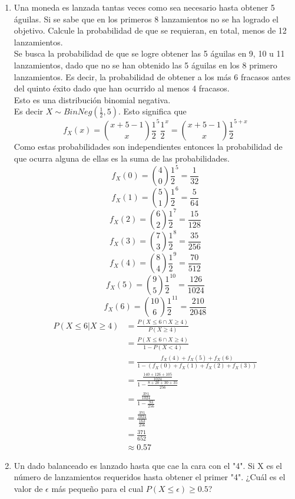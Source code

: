 \documentclass[11pt,a4paper]{report}
\begin{document}
\begin{enumerate}
		\item{
			Una moneda es lanzada tantas veces como sea necesario hasta obtener
            5 águilas. Si se sabe que en los primeros 8 lanzamientos no se ha
            logrado el objetivo. Calcule la probabilidad de que se requieran, en
            total, menos de 12 lanzamientos.\\
			Se busca la probabilidad de que se logre obtener las 5 águilas en 9,
			10 u 11 lanzamientos, dado que no se han obtenido las 5 águilas en
			los 8 primero lanzamientos. Es decir, la probabilidad de obtener a
			los más 6 fracasos antes del quinto éxito dado que han ocurrido
			al menos 4 fracasos. \\
			Esto es una distribución binomial negativa.\\
			Es decir $X \sim BinNeg(\frac{1}{2}, 5)$. Esto significa que
			\[f_X(x) = {x+5-1 \choose x} \frac{1}{2}^5 \frac{1}{2}^x =
			{x+5-1 \choose x} \frac{1}{2}^{5+x}\]
			Como estas probabilidades son independientes entonces la probabilidad
			de que ocurra alguna de ellas es la suma de las probabilidades.
			\[f_X(0) = {4 \choose 0} \frac{1}{2}^{5} = \frac{1}{32}\]
			\[f_X(1) = {5 \choose 1} \frac{1}{2}^{6} = \frac{5}{64}\]
			\[f_X(2) = {6 \choose 2} \frac{1}{2}^{7} = \frac{15}{128}\]
			\[f_X(3) = {7 \choose 3} \frac{1}{2}^{8} = \frac{35}{256}\]
			\[f_X(4) = {8 \choose 4} \frac{1}{2}^{9} = \frac{70}{512}\]
			\[f_X(5) = {9 \choose 5} \frac{1}{2}^{10} = \frac{126}{1024}\]
			\[f_X(6) = {10 \choose 6} \frac{1}{2}^{11} = \frac{210}{2048}\]
			\begin{align*}
				P(X \leq 6 | X \geq 4) &= \frac{P(X \leq 6 \cap X \geq 4)}{P(X \geq 4)}\\
							  &=\frac{P(X \leq 6 \cap X \geq 4)}{1-P(X < 4)}  \\
							  &=\frac{f_X(4) + f_X(5) + f_X(6)}
							  {1-(f_X(0) + f_X(1) + f_X(2)+ f_X(3))}  \\
							  &= \frac{\frac{140+126+105}{1024}}
							  {1-\frac{8+20+30+35}{256}} \\
							  &= \frac{\frac{371}{1024}}{1-\frac{93}{256}} \\
							  &= \frac{\frac{371}{1024}}{\frac{163}{256}} \\
							  &= \frac{371}{652} \\
							  &\approx 0.57
			\end{align*}
		}

		\item{
			Un dado balanceado es lanzado hasta que cae la cara con el "4". Si X
            es el número de lanzamientos requeridos hasta obtener el primer "4".
            ¿Cuál es el valor de $\epsilon$ más pequeño para el cual
            $P(X \leq \epsilon) \geq 0.5$?
		}


\end{enumerate}
\end{document}
